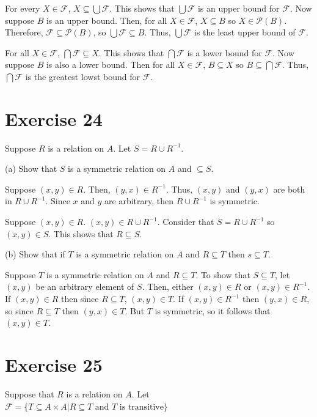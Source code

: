 \documentclass[11pt]{article}
\newcommand{\powerset}[1]{\mathscr{P}(#1)}
\newcommand{\family}[1]{\mathcal{#1}}
\begin{document}
For every $X \in \family{F}$, $X \subseteq \bigcup \family{F}$. This shows 
that $\bigcup \family{F}$ is an upper bound for $\family{F}$. Now suppose $B$
is an upper bound. Then, for all $X \in \family{F}$, $X \subseteq B$ so 
$X \in \powerset{B}$. Therefore, $\family{F} \subseteq \powerset{B}$, so 
$\bigcup \family{F} \subseteq B$. Thus, $\bigcup \family{F}$ is the least upper 
bound of $\family{F}$.

For all $X \in \family{F}$, $\bigcap \family{F} \subseteq X$. This shows that 
$\bigcap \family{F}$ is a lower bound for $\family{F}$. Now suppose $B$ is also 
a lower bound. Then for all $X \in \family{F}$, $B \subseteq X$ so 
$B \subseteq \bigcap \family{F}$. Thus, $\bigcap \family{F}$ is the greatest 
lowst bound for $\family{F}$.

\section*{Exercise 24}

Suppose $R$ is a relation on $A$. Let $S = R \cup R^{-1}$.

\noindent (a) Show that $S$ is a symmetric relation on $A$ and $ \subseteq S$.

Suppose $(x,y) \in R$. Then, $(y,x) \in R^{-1}$. Thus, $(x,y)$ and 
$(y,x)$ are both in $R \cup R^{-1}$. Since $x$ and $y$ are arbitrary, then 
$R \cup R^{-1}$ is symmetric. 

Suppose $(x,y) \in R$. $(x,y) \in R \cup R^{-1}$. Consider that $S = R \cup R^{-1}$
so $(x,y) \in S$. This shows that $R \subseteq S$.

\noindent (b) Show that if $T$ is a symmetric relation on $A$ and $R \subseteq T$
then $s \subseteq T$.

Suppose $T$ is a symmetric relation on $A$ and $R \subseteq T$. To show that 
$S \subseteq T$, let $(x,y)$ be an arbitrary element of $S$. Then, either 
$(x,y) \in R$ or $(x,y) \in R^{-1}$. If $(x,y) \in R$ then since $R \subseteq T$,
$(x,y) \in T$. If $(x,y) \in R^{-1}$ then $(y,x) \in R$, so since $R \subseteq T$
then $(y,x) \in T$. But $T$ is symmetric, so it follows that $(x,y) \in T$.

\section*{Exercise 25}

Suppose that $R$ is a relation on $A$. Let 
$\family{F} = \{T \subseteq A \times A | R \subseteq T \text{ and } T \text{ is transitive}\}$
\end{document}
